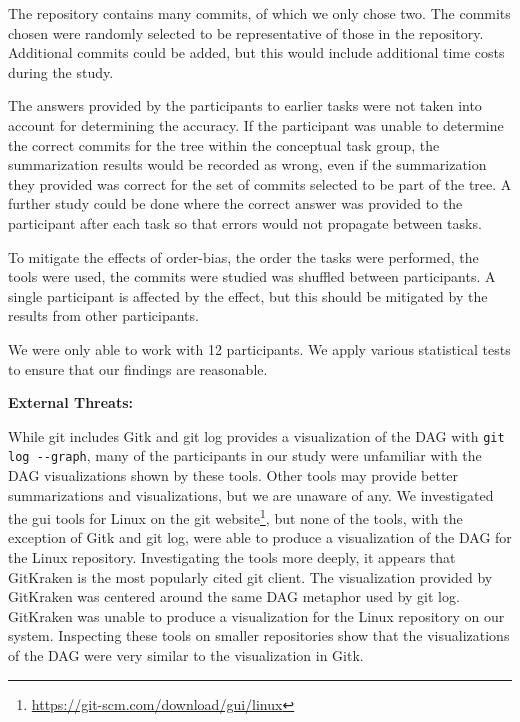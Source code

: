 The repository contains many commits, of which we only chose two. The
commits chosen were randomly selected to be representative of those in
the repository. Additional commits could be added, but this would
include additional time costs during the study.

The answers provided by the participants to earlier tasks were not
taken into account for determining the accuracy. If the participant was
unable to determine the correct commits for the tree within the
conceptual task group, the summarization results would be recorded as
wrong, even if the summarization they provided was correct for the set
of commits selected to be part of the tree. A further study could be
done where the correct answer was provided to the participant after each
task so that errors would not propagate between tasks.

To mitigate the effects of order-bias, the order the tasks were
performed, the tools were used, the commits were studied was shuffled
between participants. A single participant is affected by the effect,
but this should be mitigated by the results from other participants.

We were only able to work with 12 participants. We apply various
statistical tests to ensure that our findings are reasonable.

\textbf{External Threats:}

While git includes Gitk and git log provides a visualization of the DAG
with \verb|git log --graph|, many of the participants in our study were
unfamiliar with the DAG visualizations shown by these tools. Other tools
may provide better summarizations and visualizations, but we are unaware
of any. We investigated the gui tools for Linux on the git
website\footnote{\url{https://git-scm.com/download/gui/linux}}, but none
of the tools, with the exception of Gitk and git log, were able to
produce a visualization of the DAG for the Linux repository.
Investigating the tools more deeply, it appears that GitKraken is the
most popularly cited git client. The visualization provided by GitKraken
was centered around the same DAG metaphor used by git log. GitKraken was
unable to produce a visualization for the Linux repository on our
system. Inspecting these tools on smaller repositories show that the
visualizations of the DAG were very similar to the visualization in
Gitk.


